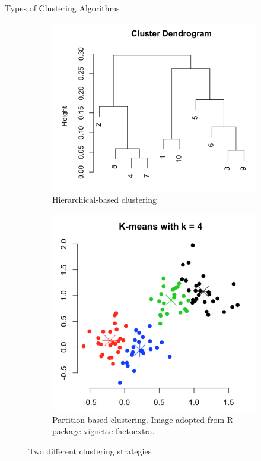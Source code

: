 \documentclass[10pt]{beamer}
\begin{document}
\begin{frame}{Types of Clustering Algorithms}
    \begin{figure}
    \centering
        \begin{subfigure}{.45\textwidth}
          \centering
          \includegraphics[width=1\linewidth]{hclust.png}
          \caption{Hierarchical-based clustering}
          \label{fig:sub1}
        \end{subfigure}
       \begin{subfigure}{.45\textwidth}
          \centering
          \includegraphics[width=1\linewidth]{partition.png}
          \caption{Partition-based clustering. Image adopted from R package vignette factoextra.}
          \label{fig:sub2}
        \end{subfigure}
    \caption{Two different clustering strategies}
    \label{fig:test}
    \end{figure}
\end{frame}
\end{document}
